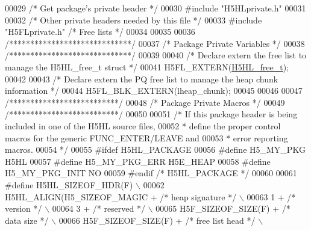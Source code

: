 \begin{DoxyCode}
00029 \textcolor{comment}{/* Get package's private header */}
00030 \textcolor{preprocessor}{#include "H5HLprivate.h"}
00031 
00032 \textcolor{comment}{/* Other private headers needed by this file */}
00033 \textcolor{preprocessor}{#include "H5FLprivate.h"}    \textcolor{comment}{/* Free lists                           */}
00034 
00035 
00036 \textcolor{comment}{/*****************************/}
00037 \textcolor{comment}{/* Package Private Variables */}
00038 \textcolor{comment}{/*****************************/}
00039 
00040 \textcolor{comment}{/* Declare extern the free list to manage the H5HL\_free\_t struct */}
00041 H5FL\_EXTERN(\hyperlink{struct_h5_h_l__free__t}{H5HL\_free\_t});
00042 
00043 \textcolor{comment}{/* Declare extern the PQ free list to manage the heap chunk information */}
00044 H5FL\_BLK\_EXTERN(lheap\_chunk);
00045 
00046 
00047 \textcolor{comment}{/**************************/}
00048 \textcolor{comment}{/* Package Private Macros */}
00049 \textcolor{comment}{/**************************/}
00050 
00051 \textcolor{comment}{/* If this package header is being included in one of the H5HL source files,}
00052 \textcolor{comment}{ *      define the proper control macros for the generic FUNC\_ENTER/LEAVE and}
00053 \textcolor{comment}{ *      error reporting macros.}
00054 \textcolor{comment}{ */}
00055 \textcolor{preprocessor}{#ifdef H5HL\_PACKAGE}
00056 \textcolor{preprocessor}{#define H5\_MY\_PKG       H5HL}
00057 \textcolor{preprocessor}{#define H5\_MY\_PKG\_ERR   H5E\_HEAP}
00058 \textcolor{preprocessor}{#define H5\_MY\_PKG\_INIT  NO}
00059 \textcolor{preprocessor}{#endif }\textcolor{comment}{/* H5HL\_PACKAGE */}\textcolor{preprocessor}{}
00060 
00061 \textcolor{preprocessor}{#define H5HL\_SIZEOF\_HDR(F)                                                  \(\backslash\)}
00062 \textcolor{preprocessor}{    H5HL\_ALIGN(H5\_SIZEOF\_MAGIC +    }\textcolor{comment}{/* heap signature   */}\textcolor{preprocessor}{                  \(\backslash\)}
00063 \textcolor{preprocessor}{        1 +                         }\textcolor{comment}{/* version          */}\textcolor{preprocessor}{                  \(\backslash\)}
00064 \textcolor{preprocessor}{        3 +                         }\textcolor{comment}{/* reserved         */}\textcolor{preprocessor}{                  \(\backslash\)}
00065 \textcolor{preprocessor}{        H5F\_SIZEOF\_SIZE(F) +        }\textcolor{comment}{/* data size        */}\textcolor{preprocessor}{                  \(\backslash\)}
00066 \textcolor{preprocessor}{        H5F\_SIZEOF\_SIZE(F) +        }\textcolor{comment}{/* free list head   */}\textcolor{preprocessor}{                  \(\backslash\)}

\end{DoxyCode}
